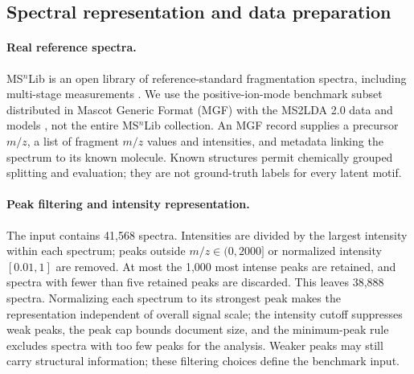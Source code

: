 \documentclass[10pt,a4paper]{article}
\begin{document}
\subsection{Spectral representation and data preparation}

\paragraph{Real reference spectra.}
MS$^{n}$Lib is an open library of reference-standard fragmentation spectra,
including multi-stage measurements \cite{brungs2025}. We use the
positive-ion-mode benchmark subset distributed in Mascot Generic Format
(MGF) with the MS2LDA 2.0 data and models \cite{msnlibdata}, not the entire
MS$^{n}$Lib collection. An MGF record supplies a precursor $m/z$, a list of
fragment $m/z$ values and intensities, and metadata linking the spectrum to
its known molecule. Known structures permit chemically grouped splitting
and evaluation; they are not ground-truth labels for every latent motif.

\paragraph{Peak filtering and intensity representation.}
The input contains 41,568 spectra. Intensities are divided by the largest
intensity within each spectrum; peaks outside $m/z\in(0,2000]$ or normalized
intensity $[0.01,1]$ are removed. At most the 1,000 most intense peaks are
retained, and spectra with fewer than five retained peaks are discarded.
This leaves 38,888 spectra. Normalizing each spectrum to its strongest peak
makes the representation
independent of overall signal scale; the intensity cutoff suppresses weak
peaks, the peak cap bounds document size, and the minimum-peak rule excludes
spectra with too few peaks for the analysis. Weaker peaks may still carry
structural information; these filtering choices define the benchmark input.
\end{document}
